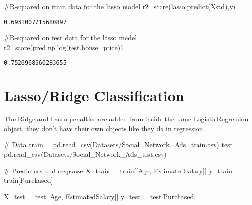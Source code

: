 \documentclass[
  letterpaper,
  DIV=11,
  numbers=noendperiod]{scrreprt}
\newenvironment{Shaded}{\begin{snugshade}}{\end{snugshade}}
\newcommand{\CommentTok}[1]{\textcolor[rgb]{0.37,0.37,0.37}{#1}}
\newcommand{\NormalTok}[1]{\textcolor[rgb]{0.00,0.23,0.31}{#1}}
\newcommand{\OperatorTok}[1]{\textcolor[rgb]{0.37,0.37,0.37}{#1}}
\newcommand{\StringTok}[1]{\textcolor[rgb]{0.13,0.47,0.30}{#1}}
\begin{document}
\begin{Shaded}
\begin{Highlighting}[]
\CommentTok{\#R{-}squared on train data for the lasso model}
\NormalTok{r2\_score(lasso.predict(Xstd),y)}
\end{Highlighting}
\end{Shaded}

\begin{verbatim}
0.6931007715680897
\end{verbatim}

\begin{Shaded}
\begin{Highlighting}[]
\CommentTok{\#R{-}squared on test data for the lasso model}
\NormalTok{r2\_score(pred,np.log(test.house\_price))}
\end{Highlighting}
\end{Shaded}

\begin{verbatim}
0.7526968660283655
\end{verbatim}

\section{Lasso/Ridge Classification}\label{lassoridge-classification}

The Ridge and Lasso penalties are added from inside the same
LogisticRegression object, they don't have their own objects like they
do in regression.

\begin{Shaded}
\begin{Highlighting}[]
\CommentTok{\# Data}
\NormalTok{train }\OperatorTok{=}\NormalTok{ pd.read\_csv(}\StringTok{\textquotesingle{}Datasets/Social\_Network\_Ads\_train.csv\textquotesingle{}}\NormalTok{) }
\NormalTok{test }\OperatorTok{=}\NormalTok{ pd.read\_csv(}\StringTok{\textquotesingle{}Datasets/Social\_Network\_Ads\_test.csv\textquotesingle{}}\NormalTok{)}
\end{Highlighting}
\end{Shaded}

\begin{Shaded}
\begin{Highlighting}[]
\CommentTok{\# Predictors and response}
\NormalTok{X\_train }\OperatorTok{=}\NormalTok{ train[[}\StringTok{\textquotesingle{}Age\textquotesingle{}}\NormalTok{, }\StringTok{\textquotesingle{}EstimatedSalary\textquotesingle{}}\NormalTok{]]}
\NormalTok{y\_train }\OperatorTok{=}\NormalTok{ train[}\StringTok{\textquotesingle{}Purchased\textquotesingle{}}\NormalTok{]}

\NormalTok{X\_test }\OperatorTok{=}\NormalTok{ test[[}\StringTok{\textquotesingle{}Age\textquotesingle{}}\NormalTok{, }\StringTok{\textquotesingle{}EstimatedSalary\textquotesingle{}}\NormalTok{]]}
\NormalTok{y\_test }\OperatorTok{=}\NormalTok{ test[}\StringTok{\textquotesingle{}Purchased\textquotesingle{}}\NormalTok{]}
\end{Highlighting}
\end{Shaded}
\end{document}
